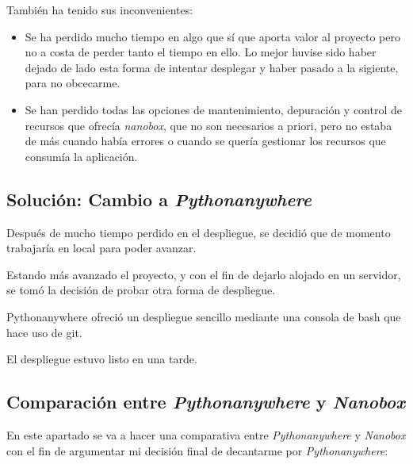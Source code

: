 También ha tenido sus inconvenientes:

\begin{itemize}
	\item Se ha perdido mucho tiempo en algo que sí que aporta valor al proyecto pero no a costa de perder tanto el tiempo en ello. Lo mejor huvise sido haber dejado de lado esta forma de intentar desplegar y haber pasado a la sigiente, para no obcecarme.
	
	\item Se han perdido todas las opciones de mantenimiento, depuración y control de recursos que ofrecía \textit{nanobox}, que no son necesarios a priori, pero no estaba de más cuando había errores o cuando se quería gestionar los recursos que consumía la aplicación.
\end{itemize}

\subsection{Solución: Cambio a \textit{Pythonanywhere}}

Después de mucho tiempo perdido en el despliegue, se decidió que de momento trabajaría en local para poder avanzar. 

Estando más avanzado el proyecto, y con el fin de dejarlo alojado en un servidor, se tomó la decisión de probar otra forma de despliegue.

Pythonanywhere ofreció un despliegue sencillo mediante una consola de bash que hace uso de git.

El despliegue estuvo listo en una tarde.

\subsection{Comparación entre \textit{Pythonanywhere} y \textit{Nanobox}}
En este apartado se va a hacer una comparativa entre \textit{Pythonanywhere} y \textit{Nanobox} con el fin de argumentar mi decisión final de decantarme por \textit{Pythonanywhere}:

